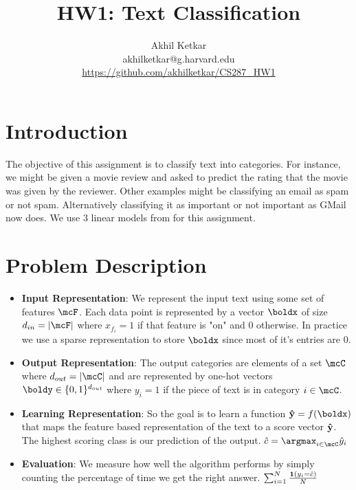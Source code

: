\documentclass[11pt]{article}
\title{HW1: Text Classification}
\author{Akhil Ketkar \\ akhilketkar@g.harvard.edu \\ \url{https://github.com/akhilketkar/CS287_HW1}}
\begin{document}
\maketitle{}

\section{Introduction}

The objective of this assignment is to classify text into categories. For
instance, we might be given a movie review and asked to predict the rating
that the movie was given by the reviewer. Other examples might be classifying
an email as spam or not spam. Alternatively classifying it as
important or not important as GMail now does. We use 3 linear models from
\citep{murphy2012machine} for this assignment.

\section{Problem Description}

\begin{itemize}
  \item \textbf{Input Representation}: We represent the input text using some set of features
  $\mcF$. Each data point is represented by a vector $\boldx$ of size
  $d_{in} = |\mcF|$ where $x_{f_i} = 1$ if that feature is "on" and 0 otherwise.
  In practice we use a sparse representation to store $\boldx$ since most of
  it's entries are 0.

  \item \textbf{Output Representation}: The output categories are elements of a set
  $\mcC$ where $d_{out} = |\mcC|$
  and are represented by one-hot vectors $\boldy \in \{0,1\}^{d_{out}}$ where
  $y_i = 1$ if the piece of text is in category $i \in \mcC$.

  \item \textbf{Learning Representation}:  So the goal is to learn a function
  $\bold{\hat{y}} = f(\boldx)$ that maps the
  feature based representation of the text to a score vector $\bold{\hat{y}}$. The
  highest scoring class is our prediction of the output.
  $\hat{c} = \argmax_{i \in \mcC} \hat{y}_i$

  \item \textbf{Evaluation}: We measure how well the algorithm performs by simply
  counting the percentage
  of time we get the right answer. $\sum_{i=1}^N \frac{\bold1(y_i = \hat{c})}{N}$

\end{itemize}
\end{document}
